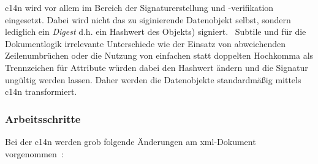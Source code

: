 \acrlong{c14n} wird vor allem im Bereich der Signaturerstellung und -verifikation eingesetzt. Dabei wird nicht das zu siginierende Datenobjekt selbst, sondern lediglich ein \emph{Digest} d.h. ein Hashwert des Objekts) signiert.~\cite[Abschnitt 2.0]{bartel2008xmlsig} Subtile und für die Dokumentlogik irrelevante Unterschiede wie der Einsatz von abweichenden Zeilenumbrüchen oder die Nutzung von einfachen statt doppelten Hochkomma als Trennzeichen für Attribute würden dabei den Hashwert ändern und die Signatur ungültig werden lassen. Daher werden die Datenobjekte standardmäßig mittels \acrlong{c14n} transformiert.~\cite[Abschnitt 4.3.3.2]{bartel2008xmlsig}

\subsubsection{Arbeitsschritte}
\label{sec:c14nsteps}

Bei der \acrlong{c14n} werden grob folgende Änderungen am
\acrshort{xml}-Dokument vorgenommen~\cite[Abschnitt 1.1]{boyer2001c14n}:

